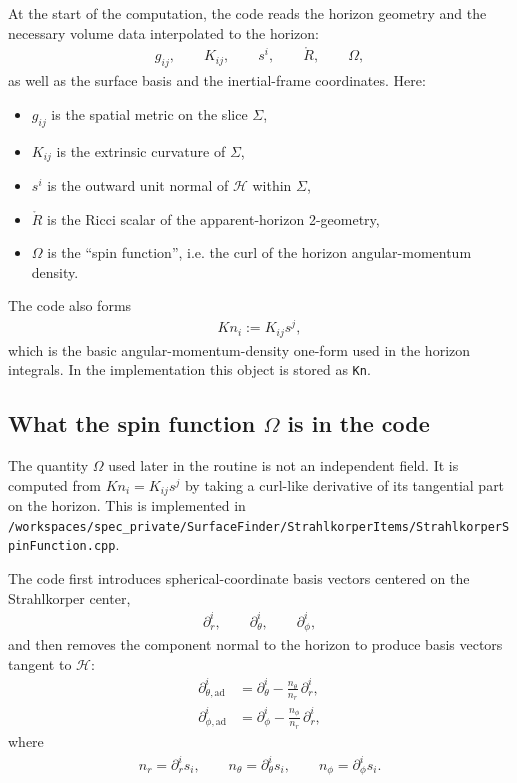 At the start of the computation, the code reads the horizon geometry and the necessary volume data interpolated to the horizon:
\begin{align}
g_{ij}, \qquad K_{ij}, \qquad s^i, \qquad \mathring{R}, \qquad \Omega,
\end{align}
as well as the surface basis and the inertial-frame coordinates.  Here:
\begin{itemize}
\item $g_{ij}$ is the spatial metric on the slice $\Sigma$,
\item $K_{ij}$ is the extrinsic curvature of $\Sigma$,
\item $s^i$ is the outward unit normal of $\mathcal H$ within $\Sigma$,
\item $\mathring{R}$ is the Ricci scalar of the apparent-horizon 2-geometry,
\item $\Omega$ is the ``spin function'', i.e. the curl of the horizon angular-momentum density.
\end{itemize}

The code also forms
\begin{align}
Kn_i := K_{ij} s^j,
\label{eq:spec-kn}
\end{align}
which is the basic angular-momentum-density one-form used in the horizon integrals.  In the implementation this object is stored as \texttt{Kn}.

\subsection{What the spin function $\Omega$ is in the code}

The quantity $\Omega$ used later in the routine is not an independent field.  It is computed from $Kn_i = K_{ij}s^j$ by taking a curl-like derivative of its tangential part on the horizon.  This is implemented in
\texttt{/workspaces/spec\_private/SurfaceFinder/StrahlkorperItems/StrahlkorperSpinFunction.cpp}.

The code first introduces spherical-coordinate basis vectors centered on the Strahlkorper center,
\begin{align}
\partial_r^i, \qquad \partial_\theta^i, \qquad \partial_\phi^i,
\end{align}
and then removes the component normal to the horizon to produce basis vectors tangent to $\mathcal H$:
\begin{align}
\partial_{\theta,\mathrm{ad}}^i
  &= \partial_\theta^i - \frac{n_\theta}{n_r}\,\partial_r^i, \\
\partial_{\phi,\mathrm{ad}}^i
  &= \partial_\phi^i - \frac{n_\phi}{n_r}\,\partial_r^i,
\end{align}
where
\begin{align}
n_r = \partial_r^i s_i,
\qquad
n_\theta = \partial_\theta^i s_i,
\qquad
n_\phi = \partial_\phi^i s_i.
\end{align}

